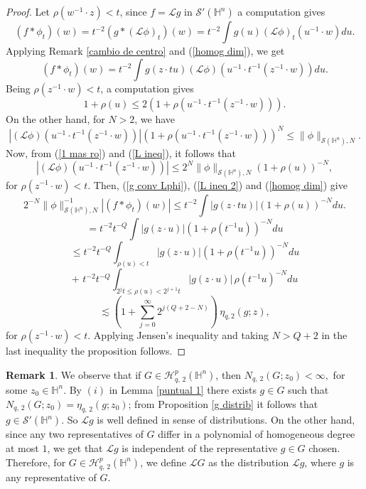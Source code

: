 \documentclass[reqno,10pt]{article}
\theoremstyle{definition}
\newtheorem{remark}[theorem]{Remark}
\numberwithin{equation}{section}
\numberwithin{theorem}{section}
\begin{document}
\begin{proof} Let $\rho(w^{-1} \cdot z) < t$, since $f = \mathcal{L} g$ in $\mathcal{S}'(\mathbb{H}^n)$ a computation gives
\[
(f \ast \phi_t)(w) = t^{-2} (g \ast (\mathcal{L} \phi)_t)(w) = t^{-2} \int g(u) (\mathcal{L} \phi)_t (u^{-1} \cdot w) du.
\]
Applying Remark \ref{cambio de centro} and (\ref{homog dim}), we get
\begin{equation} \label{g conv Lphi}
(f \ast \phi_t)(w) = t^{-2} \int g(z \cdot tu) (\mathcal{L} \phi) (u^{-1} \cdot t^{-1}(z^{-1} \cdot w)) du.
\end{equation}
Being $\rho(z^{-1} \cdot w) < t$, a computation gives
\begin{equation} \label{1 mas ro}
1 + \rho(u) \leq 2 \left( 1 + \rho(u^{-1} \cdot t^{-1}(z^{-1} \cdot w)) \right).
\end{equation}
On the other hand, for $N > 2$, we have
\begin{equation} \label{L ineq}
\left|(\mathcal{L} \phi) (u^{-1} \cdot t^{-1}(z^{-1} \cdot w))\right| \left( 1 + \rho(u^{-1} \cdot t^{-1}(z^{-1} \cdot w)) \right)^N \leq 
\| \phi \|_{\mathcal{S}(\mathbb{H}^{n}), N}.
\end{equation}
Now, from (\ref{1 mas ro}) and (\ref{L ineq}), it follows that
\begin{equation} \label{L ineq 2}
\left|(\mathcal{L} \phi) (u^{-1} \cdot t^{-1}(z^{-1} \cdot w))\right| \leq 2^N \| \phi \|_{\mathcal{S}(\mathbb{H}^{n}), N} (1 + \rho(u))^{-N},
\end{equation}
for $\rho(z^{-1} \cdot w) < t$. Then, (\ref{g conv Lphi}), (\ref{L ineq 2}) and (\ref{homog dim}) give
\[
2^{-N} \| \phi \|_{\mathcal{S}(\mathbb{H}^{n}), N}^{-1} \left|(f \ast \phi_t)(w) \right| \leq  t^{-2} \int |g(z \cdot tu)|(1 + \rho(u))^{-N} du.
\]
\[
= t^{-2} t^{-Q} \int |g(z \cdot u)|(1 + \rho(t^{-1} u))^{-N} du
\]
\[
\leq t^{-2} t^{-Q} \int_{\rho(u) < t} |g(z \cdot u)|(1 + \rho(t^{-1} u))^{-N} du 
\]
\[
+ \,\, t^{-2} t^{-Q} \int_{2^j t \leq \rho(u) < 2^{j+1}t} |g(z \cdot u)| \, \rho(t^{-1} u)^{-N} du 
\]
\[
\lesssim \left( 1 + \sum_{j=0}^{\infty} 2^{j(Q+2-N)} \right) \, \eta_{q, 2}(g; z),
\]
for $\rho(z^{-1} \cdot w) < t$. Applying Jensen's inequality and taking $N > Q+2$ in the last inequality the proposition follows.
\end{proof}

\begin{remark} \label{LG definition} We observe that if $G \in \mathcal{H}^{p}_{q, \, 2}(\mathbb{H}^{n})$, then 
$N_{q, \, 2}(G; z_0) < \infty,$ for some $z_0 \in \mathbb{H}^{n}$. By $(i)$ in Lemma \ref{puntual 1} there exists $g \in G$ such that 
$N_{q, \, 2}(G; z_0) = \eta_{q, \, 2}(g; z_0)$; from Proposition \ref{g distrib} it follows that $g  \in \mathcal{S}'(\mathbb{H}^{n})$. So 
$\mathcal{L} g$ is well defined in sense of distributions. On the other hand, since any two representatives of $G$ differ in a polynomial 
of homogeneous degree at most $1$, we get that $\mathcal{L} g$ is independent of the representative $g \in G$ chosen. Therefore, for 
$G \in \mathcal{H}^{p}_{q, \, 2}(\mathbb{H}^{n})$, we define $\mathcal{L} G$ as the distribution $\mathcal{L} g$, where $g$ is any representative of $G$.
\end{remark}
\end{document}
